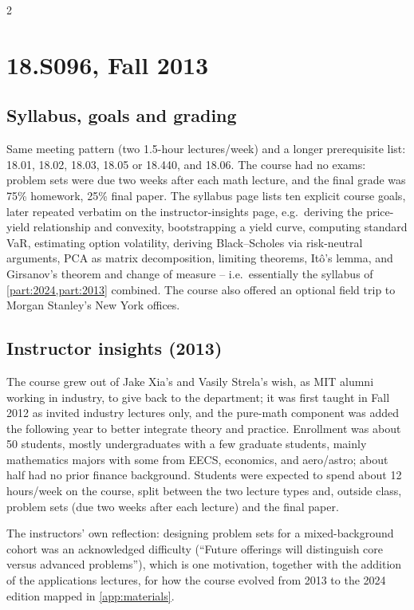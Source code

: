 \begin{paracol}{2}
\section{18.S096, Fall 2013}

\subsection{Syllabus, goals and grading}

Same meeting pattern (two 1.5-hour lectures/week) and a longer prerequisite list: 18.01, 18.02,
18.03, 18.05 or 18.440, and 18.06. The course had no exams: problem sets were due two weeks after
each math lecture, and the final grade was 75\% homework, 25\% final paper. The syllabus page lists
ten explicit course goals, later repeated verbatim on the instructor-insights page, e.g.\ deriving
the price-yield relationship and convexity, bootstrapping a yield curve, computing standard VaR,
estimating option volatility, deriving Black--Scholes via risk-neutral arguments, PCA as matrix
decomposition, limiting theorems, It\^o's lemma, and Girsanov's theorem and change of measure --
i.e.\ essentially the syllabus of \cref{part:2024,part:2013} combined. The course also offered an
optional field trip to Morgan Stanley's New York offices.

\subsection{Instructor insights (2013)}

The course grew out of Jake Xia's and Vasily Strela's wish, as MIT alumni working in industry, to
give back to the department; it was first taught in Fall 2012 as invited industry lectures only, and
the pure-math component was added the following year to better integrate theory and practice.
Enrollment was about 50 students, mostly undergraduates with a few graduate students, mainly
mathematics majors with some from EECS, economics, and aero/astro; about half had no prior finance
background. Students were expected to spend about 12 hours/week on the course, split between the two
lecture types and, outside class, problem sets (due two weeks after each lecture) and the final
paper.

\begin{coursenote}
The instructors' own reflection: designing problem sets for a mixed-background cohort was an
acknowledged difficulty (``Future offerings will distinguish core versus advanced problems''), which
is one motivation, together with the addition of the applications lectures, for how the course
evolved from 2013 to the 2024 edition mapped in \cref{app:materials}.
\end{coursenote}


\end{paracol}
